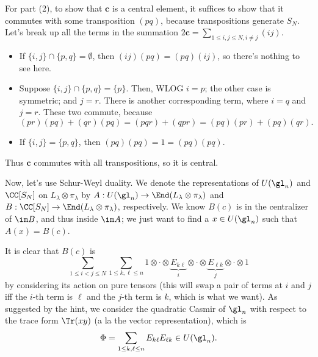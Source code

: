 \documentclass[11pt, headheight=30pt]{scrartcl}
\begin{document}
For part (2), to show that $\mathbf{c}$ is a central element, it suffices to show that it commutes with some transposition $(pq)$, because transpositions generate $S_N$. Let's break up all the terms in the summation $2\mathbf{c} = \sum_{1\leq i, j \leq N, i\neq j} (ij)$.
\begin{itemize}
    \item If $\{i,j\}\cap \{p,q\} = \emptyset$, then $(ij)(pq) = (pq)(ij)$, so there's nothing to see here.
    \item Suppose $\{i,j\}\cap \{p,q\} = \{p\}$. Then, WLOG $i = p$; the other case is symmetric; and $j = r$. There is another corresponding term, where $i = q$ and $j = r$. These two commute, because
    \[
        (pr)(pq) + (qr)(pq) = (pqr) + (qpr) = (pq)(pr) + (pq)(qr).    
    \]
    \item If $\{i,j\} = \{p,q\}$, then $(pq)(pq) = 1 = (pq)(pq)$.
\end{itemize}
Thus $\mathbf{c}$ commutes with all transpositions, so it is central.

Now, let's use Schur-Weyl duality. We denote the representations of $U(\gl_n)$ and $\CC[S_N]$ on $L_\lambda\otimes \pi_\lambda$ by $A: U(\gl_n)\to \End(L_\lambda \otimes \pi_\lambda)$ and $B: \CC[S_N]\to \End(L_\lambda \otimes \pi_\lambda)$, respectively. We know $B(c)$ is in the centralizer of $\im B$, and thus inside $\im A$; we just want to find a $x\in U(\gl_n)$ such that $A(x) = B(c)$.

It is clear that $B(c)$ is
\[
    \sum_{1\leq i <  j \leq N} \sum_{1\leq k,\ell \leq n} 1 \otimes \cdot \otimes \underbrace{E_{k\ell}}_{i} \otimes \cdot \otimes \underbrace{E_{\ell k}}_{j} \otimes \cdot \otimes 1
\]
by considering its action on pure tensors (this will swap a pair of terms at $i$ and $j$ iff the $i$-th term is $\ell$ and the $j$-th term is $k$, which is what we want). As suggested by the hint, we consider the quadratic Casmir of $\gl_n$ with respect to the trace form $\Tr(xy)$ (a la the vector representation), which is
\[
    \Phi = \sum_{1\leq k,\ell \leq n} E_{k\ell}E_{\ell k}\in U(\gl_n).
\]
\end{document}
